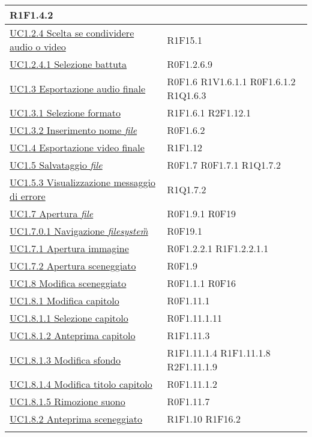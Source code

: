 \begin{center}
\begin{longtable}{| p{10.25cm} | p{2.5cm} | }
R1F1.4.2  \\ \hline  \hyperref[sec:UC1.2.4]{ UC1.2.4 Scelta se condividere audio o video } &  R1F15.1  \\ \hline  \hyperref[sec:UC1.2.4.1]{ UC1.2.4.1 Selezione battuta } &  R0F1.2.6.9  \\ \hline  \hyperref[sec:UC1.3]{ UC1.3 Esportazione audio finale } &  R0F1.6  \newline R1V1.6.1.1  \newline R0F1.6.1.2  \newline R1Q1.6.3  \\ \hline  \hyperref[sec:UC1.3.1]{ UC1.3.1 Selezione formato } &  R1F1.6.1  \newline R2F1.12.1  \\ \hline  \hyperref[sec:UC1.3.2]{ UC1.3.2 Inserimento nome \textit{file} } &  R0F1.6.2  \\ \hline  \hyperref[sec:UC1.4]{ UC1.4 Esportazione video finale } &  R1F1.12  \\ \hline  \hyperref[sec:UC1.5]{ UC1.5 Salvataggio \textit{file} } &  R0F1.7  \newline R0F1.7.1  \newline R1Q1.7.2  \\ \hline  \hyperref[sec:UC1.5.3]{ UC1.5.3 Visualizzazione messaggio di errore } &  R1Q1.7.2  \\ \hline  \hyperref[sec:UC1.7]{ UC1.7 Apertura \textit{file} } &  R0F1.9.1  \newline R0F19  \\ \hline  \hyperref[sec:UC1.7.0.1]{ UC1.7.0.1 Navigazione \textit{filesystem}\G } &  R0F19.1  \\ \hline  \hyperref[sec:UC1.7.1]{ UC1.7.1 Apertura immagine } &  R0F1.2.2.1  \newline R1F1.2.2.1.1  \\ \hline  \hyperref[sec:UC1.7.2]{ UC1.7.2 Apertura sceneggiato } &  R0F1.9  \\ \hline  \hyperref[sec:UC1.8]{ UC1.8 Modifica sceneggiato } &  R0F1.1.1  \newline R0F16  \\ \hline  \hyperref[sec:UC1.8.1]{ UC1.8.1 Modifica capitolo } &  R0F1.11.1  \\ \hline  \hyperref[sec:UC1.8.1.1]{ UC1.8.1.1 Selezione capitolo } &  R0F1.11.1.11  \\ \hline  \hyperref[sec:UC1.8.1.2]{ UC1.8.1.2 Anteprima capitolo } &  R1F1.11.3  \\ \hline  \hyperref[sec:UC1.8.1.3]{ UC1.8.1.3 Modifica sfondo } &  R1F1.11.1.4  \newline R1F1.11.1.8  \newline R2F1.11.1.9  \\ \hline  \hyperref[sec:UC1.8.1.4]{ UC1.8.1.4 Modifica titolo capitolo } &  R0F1.11.1.2  \\ \hline  \hyperref[sec:UC1.8.1.5]{ UC1.8.1.5 Rimozione suono } &  R0F1.11.7  \\ \hline  \hyperref[sec:UC1.8.2]{ UC1.8.2 Anteprima sceneggiato } &  R1F1.10  \newline R1F16.2  \\ \hline  \hyperref[sec:UC1.9]{ 
\end{longtable}
\end{center}
